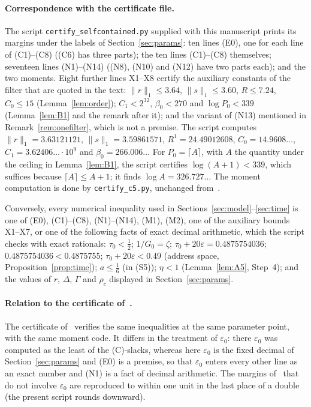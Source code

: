 \documentclass[11pt]{article}
\theoremstyle{definition}
\newcommand{\eps}{\varepsilon}
\newcommand{\ceil}[1]{\lceil #1\rceil}
\begin{document}
\paragraph{Correspondence with the certificate file.} The script \texttt{certify\_selfcontained.py} supplied with
this manuscript prints its margins under the labels of Section~\ref{sec:params}: ten lines \textup{(E0)}, one for
each line of \textup{(C1)--(C8)} (\textup{(C6)} has three parts); the ten lines \textup{(C1)--(C8)} themselves;
seventeen lines \textup{(N1)--(N14)} (\textup{(N8)}, \textup{(N10)} and \textup{(N12)} have two parts each); and
the two moments. Eight further lines X1--X8 certify the auxiliary constants of the filter that are quoted in the
text: $\|r\|_1\le3.64$, $\|s\|_1\le3.60$, $R\le7.24$, $C_0\le15$ (Lemma~\ref{lem:order}); $C_1<2^{32}$,
$\beta_0<270$ and $\log P_0<339$ (Lemma~\ref{lem:B1} and the remark after it); and the variant of \textup{(N13)}
mentioned in Remark~\ref{rem:onefilter}, which is not a premise. The script computes
$\|r\|_1=3.63121121$, $\|s\|_1=3.59861571$, $R^1=24.49012608$, $C_0=14.9608\ldots$,
$C_1=3.62406\ldots\cdot10^{9}$ and $\beta_0=266.006\ldots$ For $P_0=\ceil A$, with $A$ the quantity under the
ceiling in Lemma~\ref{lem:B1}, the script certifies $\log(A+1)<339$, which suffices because $\ceil A\le A+1$; it
finds $\log A=326.727\ldots$ The moment computation is done
by \texttt{certify\_c5.py}, unchanged from~\cite{V}.

Conversely, every numerical inequality used in
Sections~\ref{sec:model}--\ref{sec:time} is one of \textup{(E0)}, \textup{(C1)--(C8)}, \textup{(N1)--(N14)},
\textup{(M1)}, \textup{(M2)}, one of the auxiliary bounds X1--X7, or one of the following facts of exact decimal
arithmetic, which the script checks with exact rationals: $\tau_0<\tfrac12$; $1/G_0=\zeta$;
$\tau_0+20\eps=0.4875754036$; $0.4875754036<0.4875755$; $\tau_0+20\eps<0.49$ (address space,
Proposition~\ref{prop:time}); $a\le\tfrac16$ (in \textup{(S5)}); $\eta<1$ (Lemma~\ref{lem:A5}, Step~4); and the
values of $r$, $\Delta$, $\Gamma$ and $\rho_c$ displayed in Section~\ref{sec:params}.

\paragraph{Relation to the certificate of~\cite{V}.} The certificate of~\cite{V} verifies the same inequalities at
the same parameter point, with the same moment code. It differs in the treatment of $\eps_0$: there $\eps_0$ was
computed as the least of the \textup{(C)}-slacks, whereas here $\eps_0$ is the fixed decimal of
Section~\ref{sec:params} and \textup{(E0)} is a premise, so that $\eps_0$ enters every other line as an exact number
and \textup{(N1)} is a fact of decimal arithmetic. The margins of~\cite{V} that do not involve $\eps_0$ are
reproduced to within one unit in the last place of a double (the present script rounds downward).
\end{document}
